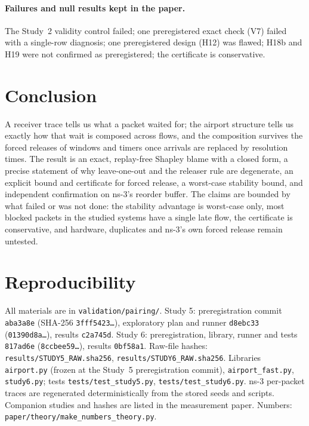 \documentclass[11pt]{article}
\theoremstyle{definition}
\begin{document}
\paragraph{Failures and null results kept in the paper.} The Study~2 validity control failed; one preregistered exact check (V7) failed with a single-row diagnosis; one preregistered design (H12) was flawed; H18b and H19 were not confirmed as preregistered; the certificate is conservative.

\section{Conclusion}
A receiver trace tells us what a packet waited for; the airport structure tells us exactly how that wait is composed across flows, and the composition survives the forced releases of windows and timers once arrivals are replaced by resolution times. The result is an exact, replay-free Shapley blame with a closed form, a precise statement of why leave-one-out and the releaser rule are degenerate, an explicit bound and certificate for forced release, a worst-case stability bound, and independent confirmation on ns-3's reorder buffer. The claims are bounded by what failed or was not done: the stability advantage is worst-case only, most blocked packets in the studied systems have a single late flow, the certificate is conservative, and hardware, duplicates and ns-3's own forced release remain untested.

\section*{Reproducibility}
All materials are in \texttt{validation/pairing/}. Study 5: preregistration commit \texttt{aba3a8e} (SHA-256 \texttt{3fff5423\dots}), exploratory plan and runner \texttt{d8ebc33} (\texttt{01390d8a\dots}), results \texttt{c2a745d}. Study 6: preregistration, library, runner and tests \texttt{817ad6e} (\texttt{8ccbee59\dots}), results \texttt{0bf58a1}. Raw-file hashes: \texttt{results/STUDY5\_RAW.sha256}, \texttt{results/STUDY6\_RAW.sha256}. Libraries \texttt{airport.py} (frozen at the Study~5 preregistration commit), \texttt{airport\_fast.py}, \texttt{study6.py}; tests \texttt{tests/test\_study5.py}, \texttt{tests/test\_study6.py}. ns-3 per-packet traces are regenerated deterministically from the stored seeds and scripts. Companion studies and hashes are listed in the measurement paper. Numbers: \texttt{paper/theory/make\_numbers\_theory.py}.
\end{document}
